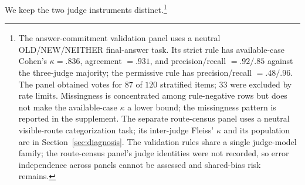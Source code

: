 \documentclass[letterpaper]{article} %
\begin{document}
We keep the two judge instruments distinct.\footnote{The answer-commitment validation panel uses a neutral OLD/NEW/NEITHER final-answer task. Its strict rule has available-case Cohen's \(\kappa=.836\), agreement \(=.931\), and precision/recall \(=.92/.85\) against the three-judge majority; the permissive rule has precision/recall \(=.48/.96\). The panel obtained votes for \(87\) of \(120\) stratified items; \(33\) were excluded by rate limits. Missingness is concentrated among rule-negative rows but does not make the available-case \(\kappa\) a lower bound; the missingness pattern is reported in the supplement. The separate route-census panel uses a neutral visible-route categorization task; its inter-judge Fleiss' \(\kappa\) and its population are in Section~\ref{sec:diagnosis}. The validation rules share a single judge-model family; the route-census panel's judge identities were not recorded, so error independence across panels cannot be assessed and shared-bias risk remains.} %
\end{document}
